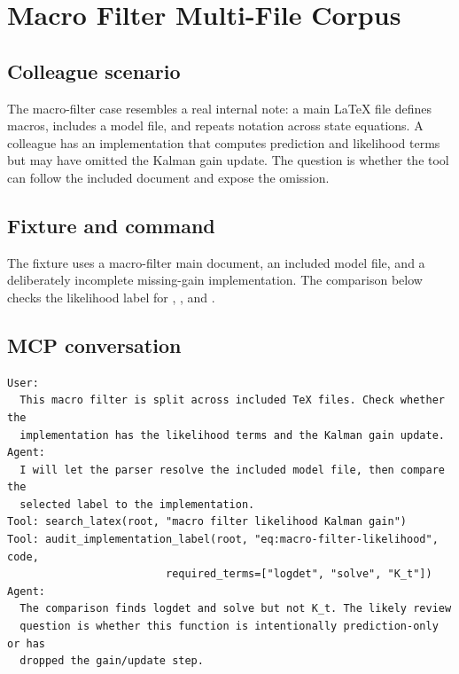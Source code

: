\documentclass[12pt,a4paper,openany]{book}
\begin{document}
\chapter{Macro Filter Multi-File Corpus}

\section*{Colleague scenario}

The macro-filter case resembles a real internal note: a main LaTeX file defines
macros, includes a model file, and repeats notation across state equations. A
colleague has an implementation that computes prediction and likelihood terms
but may have omitted the Kalman gain update. The question is whether the tool
can follow the included document and expose the omission.

\section*{Fixture and command}

The fixture uses a macro-filter main document, an included model file, and a
deliberately incomplete missing-gain implementation. The comparison below
checks the likelihood label for , , and .

\section*{MCP conversation}

\begin{lstlisting}[basicstyle=\ttfamily\scriptsize]
User:
  This macro filter is split across included TeX files. Check whether the
  implementation has the likelihood terms and the Kalman gain update.
Agent:
  I will let the parser resolve the included model file, then compare the
  selected label to the implementation.
Tool: search_latex(root, "macro filter likelihood Kalman gain")
Tool: audit_implementation_label(root, "eq:macro-filter-likelihood", code,
                         required_terms=["logdet", "solve", "K_t"])
Agent:
  The comparison finds logdet and solve but not K_t. The likely review
  question is whether this function is intentionally prediction-only or has
  dropped the gain/update step.
\end{lstlisting}


\end{document}
